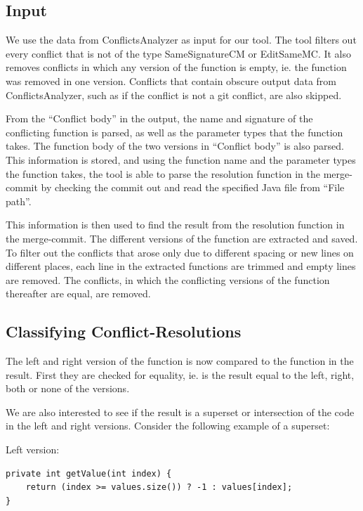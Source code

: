 \subsection{Input}
We use the data from ConflictsAnalyzer as input for our tool. The tool filters out every conflict that is not of the type SameSignatureCM or EditSameMC. It also removes conflicts in which any version of the function is empty, ie. the function was removed in one version. Conflicts that contain obscure output data from ConflictsAnalyzer, such as if the conflict is not a git conflict, are also skipped.

From the “Conflict body” in the output, the name and signature of the conflicting function is parsed, as well as the parameter types that the function takes. The function body of the two versions in “Conflict body” is also parsed. This information is stored, and using the function name and the parameter types the function takes, the tool is able to parse the resolution function in the merge-commit by checking the commit out and read the specified Java file from “File path”.

This information is then used to find the result from the resolution function in the merge-commit. The different versions of the function are extracted and saved. To filter out the conflicts that arose only due to different spacing or new lines on different places, each line in the extracted functions are trimmed and empty lines are removed. The conflicts, in which the conflicting versions of the function thereafter are equal, are removed.

\subsection{Classifying Conflict-Resolutions}
The left and right version of the function is now compared to the function in the result. First they are checked for equality, ie. is the result equal to the left, right, both or none of the versions.

We are also interested to see if the result is a superset or intersection of the code in the left and right versions. Consider the following example of a superset:

Left version:
\lstset{language=Java,numbers=left,xleftmargin=2em,frame=single,framexleftmargin=1.5em}
\begin{lstlisting}[frame=single]
private int getValue(int index) {
	return (index >= values.size()) ? -1 : values[index];
}
\end{lstlisting}

